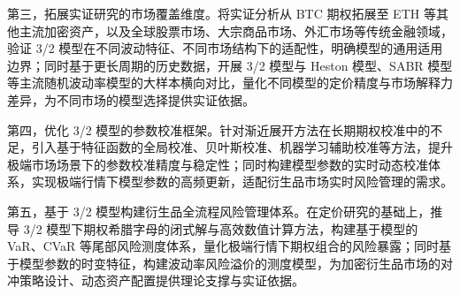 第三，拓展实证研究的市场覆盖维度。将实证分析从 BTC 期权拓展至 ETH 等其他主流加密资产，以及全球股票市场、大宗商品市场、外汇市场等传统金融领域，验证 3/2 模型在不同波动特征、不同市场结构下的适配性，明确模型的通用适用边界；同时基于更长周期的历史数据，开展 3/2 模型与 Heston 模型、SABR 模型等主流随机波动率模型的大样本横向对比，量化不同模型的定价精度与市场解释力差异，为不同市场的模型选择提供实证依据。

第四，优化 3/2 模型的参数校准框架。针对渐近展开方法在长期期权校准中的不足，引入基于特征函数的全局校准、贝叶斯校准、机器学习辅助校准等方法，提升极端市场场景下的参数校准精度与稳定性；同时构建模型参数的实时动态校准体系，实现极端行情下模型参数的高频更新，适配衍生品市场实时风险管理的需求。

第五，基于 3/2 模型构建衍生品全流程风险管理体系。在定价研究的基础上，推导 3/2 模型下期权希腊字母的闭式解与高效数值计算方法，构建基于模型的 VaR、CVaR 等尾部风险测度体系，量化极端行情下期权组合的风险暴露；同时基于模型参数的时变特征，构建波动率风险溢价的测度模型，为加密衍生品市场的对冲策略设计、动态资产配置提供理论支撑与实证依据。